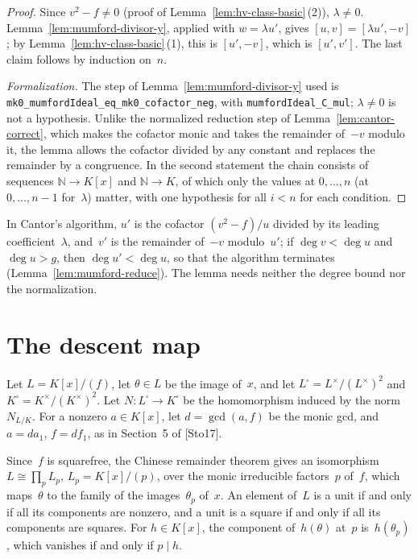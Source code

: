 \begin{proof}
\leanok
{}
Since $v^2 - f \ne 0$ (proof of Lemma~\ref{lem:hv-class-basic}\,(2)), $\lambda \ne 0$.
Lemma~\ref{lem:mumford-divisor-y}, applied with $w = \lambda u'$, gives
$[u, v] = [\lambda u', -v]$; by Lemma~\ref{lem:hv-class-basic}\,(1), this is $[u', -v]$, which is
$[u', v']$. The last claim follows by induction on~$n$.

\emph{Formalization.} The step of Lemma~\ref{lem:mumford-divisor-y} used is
\texttt{mk0\_mumfordIdeal\_eq\_mk0\_cofactor\_neg}, with \texttt{mumfordIdeal\_C\_mul};
$\lambda \ne 0$ is not a hypothesis. Unlike the normalized reduction step of
Lemma~\ref{lem:cantor-correct}, which makes the cofactor monic and takes the remainder of~$-v$
modulo it, the lemma allows the cofactor divided by any constant and replaces the remainder by a
congruence. In the second statement the chain consists of sequences $\mathbb N \to K[x]$ and
$\mathbb N \to K$, of which only the values at $0, \dots, n$ (at $0, \dots, n - 1$ for~$\lambda$)
matter, with one hypothesis for all $i < n$ for each condition.
\end{proof}

In Cantor's algorithm, $u'$ is the cofactor $(v^2 - f)/u$ divided by its leading
coefficient~$\lambda$, and~$v'$ is the remainder of~$-v$ modulo~$u'$; if $\deg v < \deg u$ and
$\deg u > g$, then $\deg u' < \deg u$, so that the algorithm terminates
(Lemma~\ref{lem:mumford-reduce}). The lemma needs neither the degree bound nor the normalization.

\section{The descent map}
\label{sec:ds-map}

\begin{setting}
\label{set:ds-setting}
Let $L = K[x]/(f)$, let $\theta \in L$ be the image of~$x$, and let
$L^\square = L^\times/(L^\times)^2$ and $K^\square = K^\times/(K^\times)^2$. Let
$N \colon L^\square \to K^\square$ be the homomorphism induced by the norm~$N_{L/K}$. For a nonzero
$a \in K[x]$, let $d = \gcd(a, f)$ be the monic gcd, and $a = d a_1$, $f = d f_1$, as in
Section~5 of [Sto17].
\end{setting}

Since~$f$ is squarefree, the Chinese remainder theorem gives an isomorphism
$L \cong \prod_p L_p$, $L_p = K[x]/(p)$, over the monic irreducible factors~$p$ of~$f$, which
maps~$\theta$ to the family of the images~$\theta_p$ of~$x$. An element of~$L$ is a unit if and
only if all its components are nonzero, and a unit is a square if and only if all its components
are squares. For $h \in K[x]$, the component of~$h(\theta)$ at~$p$ is~$h(\theta_p)$, which
vanishes if and only if $p \mid h$.

